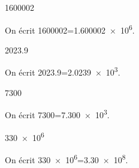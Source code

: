 \begin{enonce}
\num{1600002}
\end{enonce}


\begin{corrige}
On écrit \num{1600002}=\num{1.600002e6}.
\end{corrige}



\begin{enonce}
\num{2023.9}
\end{enonce}


\begin{corrige}
On écrit \num{2023.9}=\num{2.0239e3}.
\end{corrige}




\begin{enonce}
\num{7300}
\end{enonce}


\begin{corrige}
On écrit \num{7300}=\num{7.300e3}.
\end{corrige}



\begin{enonce}
\num{330e6}
\end{enonce}


\begin{corrige}
On écrit \num{330e6}=\num{3.30e8}.
\end{corrige}



